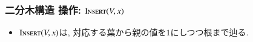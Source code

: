 \documentclass[main]{subfiles}
\begin{document}
\begin{frame}\frametitle{二分木構造 操作: $\mathrm{\text{I\textsc{nsert}}}(V,x)$}
\begin{itemize}
\item $\mathrm{\text{I\textsc{nsert}}}(V,x)$は, 対応する葉から親の値を$1$にしつつ根まで辿る.
\end{itemize}
 

\end{frame}
\end{document}
